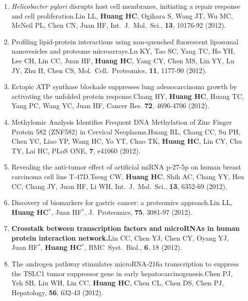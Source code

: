 \documentclass[10pt,a4paper]{article}
\def\mypub#1#2#3{{#1.}\newline #2, #3.}
\def\mybpub#1#2#3{{\boldmath \bf #1.}\newline #2, #3.}
\def\cited#1{Cited $\ge$ #1}
\begin{document}
\begin{enumerate}
\item
\mypub{\textsl{Helicobacter pylori}  disrupts  host  cell  membranes,  initiating a repair response and cell proliferation}
{Lin LL, {\bf Huang HC}, Ogihara S, Wang JT, Wu MC, McNeil PL, Chen CN, Juan HF}
{Int.\ J.\ Mol.\ Sci., {\bf 13}, 10176-92 (2012)}

\item
\mypub{Profiling lipid-protein interactions using non-quenched fluorescent liposomal nanovesicles and proteome microarrays}
{Lu KY, Tao SC, Yang TC, Ho YH, Lee CH, Lin CC, Juan HF, {\bf Huang HC}, Yang CY, Chen MS, Lin YY, Lu JY, Zhu H, Chen CS}
{Mol.\ Cell.\ Proteomics, {\bf 11}, 1177-90 (2012)}

\item
\mypub{Ectopic ATP synthase blockade suppresses lung adenocarcinoma growth by activating the unfolded protein response}
{Chang HY, {\bf Huang HC}, Huang TC, Yang PC, Wang YC, Juan HF}
{Cancer Res. {\bf 72}, 4696-4706 (2012)}

\item
\mypub{Methylomic Analysis Identifies Frequent DNA Methylation of Zinc Finger Protein 582 (ZNF582) in Cervical Neoplasms}
{Huang RL, Chang CC, Su PH, Chen YC, Liao YP, Wang HC, Yo YT, Chao TK, {\bf Huang HC}, Lin CY, Chu TY, Lai HC}
{PLoS ONE, {\bf 7}, e41060 (2012)}

\item
\mypub{Revealing the anti-tumor effect of artificial miRNA p-27-5p on
human breast carcinoma cell line T-47D}
{Tseng CW, {\bf Huang HC}, Shih AC, Chang YY, Hsu CC, Chang JY, Juan HF, Li WH}
{Int.\ J.\ Mol.\ Sci., {\bf 13}, 6352-69 (2012)}

\item
\mypub{Discovery of biomarkers for gastric cancer: a proteomics approach}
{Lin LL, {\bf Huang HC$^*$}, Juan HF$^*$}
{J.\ Proteomics, {\bf 75}, 3081-97 (2012)}

\item
\mybpub{Crosstalk between transcription factors and microRNAs in human protein interaction network}
{Lin CC, Chen YJ, Chen CY, Oyang YJ, Juan HF$^{*}$, {\bf Huang HC$^{*}$}}
{BMC\ Syst.\ Biol., {\bf 6}, 18 (2012)}

\item
\mypub{The androgen pathway stimulates microRNA-216a transcription to suppress
the TSLC1 tumor suppressor gene in early hepatocarcinogenesis}
{Chen PJ, Yeh SH, Liu WH, Lin CC, {\bf Huang HC}, Chen CL, Chen DS, Chen PJ}
{Hepatology, {\bf 56}, 632-43 (2012)}


\end{enumerate}
\end{document}
